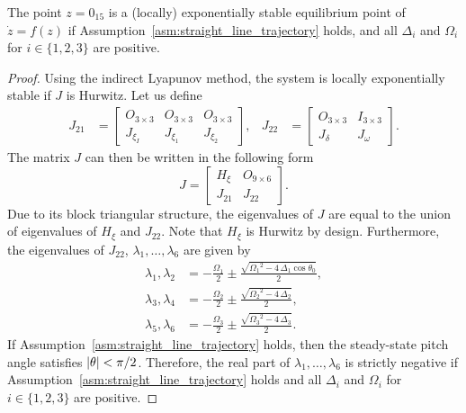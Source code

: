 \begin{prop}
    The point $z = 0_{15}$ is a (locally) exponentially stable equilibrium point of $\dot{z} = f(z)$ if Assumption~\ref{asm:straight_line_trajectory} holds, and all $\Delta_i$ and $\Omega_i$ for $i \in \{1,2,3\}$ are positive.
    \label{prop:straight_line_trajectory}
\end{prop}
\begin{proof}
    Using the indirect Lyapunov method, the system is locally exponentially stable if $J$ is Hurwitz.
    Let us define
    \begin{align}
        J_{21}\! &= \!\begin{bmatrix}
            O_{3 \times 3}\!\! & O_{3 \times 3}\!\! & O_{3 \times 3} \\
            J_{\xi_I} & J_{\xi_1} & J_{\xi_2}
        \end{bmatrix}, &
        J_{22}\! &= \!\begin{bmatrix}
            O_{3 \times 3}\!\! & I_{3 \times 3} \\
            J_{\delta} & J_{\omega}
        \end{bmatrix}\!.
    \end{align}
    The matrix $J$ can then be written in the following form
    \begin{equation}
        J = \begin{bmatrix}
            H_{\xi} & O_{9 \times 6} \\
            J_{21} & J_{22}
        \end{bmatrix}.
    \end{equation}
    Due to its block triangular structure, the eigenvalues of $J$ are equal to the union of eigenvalues of $H_{\xi}$ and $J_{22}$.
    Note that $H_{\xi}$ is Hurwitz by design.
    Furthermore, the eigenvalues of $J_{22}$, $\lambda_1, \ldots, \lambda_6$ are given by
    \begin{subequations}
        \begin{align}
            \lambda_1, \lambda_2 &= -\frac{\Omega_{1}}{2} \pm \frac{\sqrt{{\Omega_{1}}^2-4\,\Delta_{1}\cos\theta_0}}{2}, \\
            \lambda_3, \lambda_4 &= -\frac{\Omega_{2}}{2} \pm \frac{\sqrt{{\Omega_{2}}^2-4\,\Delta_{2}}}{2}, \\
            \lambda_5, \lambda_6 &= -\frac{\Omega_{3}}{2} \pm \frac{\sqrt{{\Omega_{3}}^2-4\,\Delta_{3}}}{2}.
        \end{align}
    \end{subequations}
    If Assumption~\ref{asm:straight_line_trajectory} holds, then the steady-state pitch angle satisfies $\left|\theta\right| < \pi/2$.
    Therefore, the real part of $\lambda_1, \ldots, \lambda_6$ is strictly negative if Assumption~\ref{asm:straight_line_trajectory} holds and all $\Delta_i$ and $\Omega_i$ for $i \in \{1,2,3\}$ are positive.
\end{proof}

